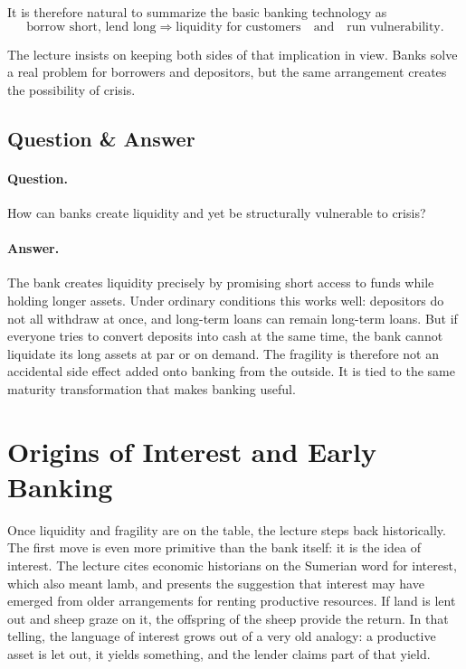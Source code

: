 It is therefore natural to summarize the basic banking technology as
\begin{equation}
\text{borrow short, lend long}
\Rightarrow
\text{liquidity for customers}
\quad \text{and} \quad
\text{run vulnerability}.
\end{equation}

The lecture insists on keeping both sides of that implication in view. Banks solve a real problem for borrowers and depositors, but the same arrangement creates the possibility of crisis.

\subsection{Question \& Answer}

\paragraph{Question.} How can banks create liquidity and yet be structurally vulnerable to crisis?

\paragraph{Answer.} The bank creates liquidity precisely by promising short access to funds while holding longer assets. Under ordinary conditions this works well: depositors do not all withdraw at once, and long-term loans can remain long-term loans. But if everyone tries to convert deposits into cash at the same time, the bank cannot liquidate its long assets at par or on demand. The fragility is therefore not an accidental side effect added onto banking from the outside. It is tied to the same maturity transformation that makes banking useful.

\section{Origins of Interest and Early Banking}

Once liquidity and fragility are on the table, the lecture steps back historically. The first move is even more primitive than the bank itself: it is the idea of interest. The lecture cites economic historians on the Sumerian word for interest, which also meant lamb, and presents the suggestion that interest may have emerged from older arrangements for renting productive resources. If land is lent out and sheep graze on it, the offspring of the sheep provide the return. In that telling, the language of interest grows out of a very old analogy: a productive asset is let out, it yields something, and the lender claims part of that yield.

